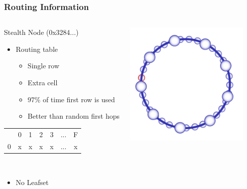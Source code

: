 \documentclass[xcolor=pdftex,dvipsnames,table]{beamer}
\begin{document}
\begin{frame}
    \frametitle{Routing Information}

    \begin{columns}

    \column{5.5cm}
    \begin{overlayarea}{\textwidth}{1\textheight}
    Stealth Node (0x3284...)

    \begin{itemize}
        \item{Routing table}
        \begin{itemize}
            \item{Single row}
            \item{Extra cell}
            \item{\footnotesize 97\% of time first row is used}
            \item{\footnotesize Better than random first hops}
        \end{itemize}
    \end{itemize}

    \begin{tabular}{l!{\vrule}c c c c c c}
    \hline
      & 0 & 1 & 2 & 3 & ... & F\\
    0 & x & x & x & x & ... & x\\
    \end{tabular}

    ~\\
    \begin{itemize}
        \item{No Leafset}
    \end{itemize}

    \end{overlayarea}

    \column{5.5cm}

    \begin{center}
        \begin{overlayarea}{\textwidth}{\textheight}
            \includegraphics[width=6cm]{diagrams/StealthHighlight}
        \end{overlayarea}
    \end{center}

    \end{columns}

\end{frame}
\end{document}
